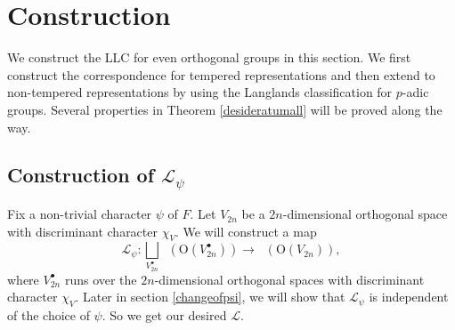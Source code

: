\documentclass[article]{article}
\numberwithin{equation}{section}
\theoremstyle{definition}
\DeclareMathOperator{\im}{Im}
\DeclareMathOperator{\GSP}{GSp}
\DeclareMathOperator{\SP}{Sp}
\DeclareMathOperator{\Irr}{Irr}
\DeclareMathOperator{\Irrt}{Irr_{temp}}
\DeclareMathOperator{\Para}{\Phi_{temp}}
\begin{document}










\section{Construction}\label{construction}
We construct the LLC for even orthogonal groups in this section. We first construct the correspondence for tempered representations and then extend to non-tempered representations by using the Langlands classification for $p$-adic groups. Several properties in Theorem \ref{desideratumall} will be proved along the way. 
\subsection{Construction of $\mathcal L_{\psi}$}
Fix a non-trivial character $\psi$ of $F$. Let $V_{2n}$ be a $2n$-dimensional orthogonal space with discriminant character $\chi_{V}$. We will construct a map 
$$
\mathcal L_{\psi}: \bigsqcup_{V_{2n}^{\bullet}} \Irrt \left(\mathrm O(V_{2n}^\bullet)\right) \longrightarrow \Para(\mathrm O(V_{2n})),$$
where $V_{2n}^{\bullet}$ runs over the $2n$-dimensional orthogonal spaces with discriminant character $\chi_V$. Later in section \ref{changeofpsi}, we will show that $\mathcal L_\psi$ is independent of the choice of $\psi$. So we get our desired $\mathcal L$.  
\end{document}
